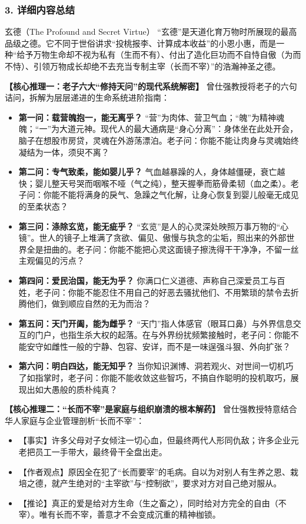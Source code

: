 \subsubsection{3. 详细内容总结}

\begin{ConceptBox}{玄德（The Profound and Secret Virtue）}
“玄德”是天道化育万物时所展现的最高品级之德。它不同于世俗讲求“投桃报李、计算成本收益”的小恩小惠，而是一种“给予万物生命却不视为私有（生而不有）、付出了造化巨功而不自恃自傲（为而不恃）、引领万物成长却绝不去充当专制主宰（长而不宰）”的浩瀚神圣之德。
\end{ConceptBox}

\noindent\textbf{【核心推理一：老子六大“修持天问”的现代系统解密】}
曾仕强教授将老子的六句诘问，拆解为层层递进的生命系统进阶指南：
\begin{itemize}
    \item \textbf{第一问：载营魄抱一，能无离乎？}
    “营”为肉体、营卫气血；“魄”为精神魂魄；“一”为大道元神。现代人的最大通病是“身心分离”：身体坐在此处开会，脑子在想股市房贷，灵魂在外游荡漂泊。老子问：你能不能让肉身与灵魂始终凝结为一体，须臾不离？
    \item \textbf{第二问：专气致柔，能如婴儿乎？}
    气血越暴躁的人，身体越僵硬，衰亡越快；婴儿整天号哭而咽喉不哑（气之纯），整天握拳而筋骨柔韧（血之柔）。老子问：你能不能将满身的戾气、急躁之气化解，让身心恢复到婴儿般毫无成见的至柔状态？
    \item \textbf{第三问：涤除玄览，能无疵乎？}
    “玄览”是人的心灵深处映照万事万物的“心镜”。世人的镜子上堆满了贪欲、偏见、傲慢与执念的尘垢，照出来的外部世界全是扭曲的。老子问：你能不能把心灵这面镜子擦洗得干干净净，不留一丝主观偏见的污点？
    \item \textbf{第四问：爱民治国，能无为乎？}
    你满口仁义道德、声称自己深爱员工与百姓，老子问：你能不能忍住不用自己的好恶去骚扰他们、不用繁琐的禁令去折腾他们，做到顺应自然的无为而治？
    \item \textbf{第五问：天门开阖，能为雌乎？}
    “天门”指人体感官（眼耳口鼻）与外界信息交互的门户，也指生杀大权的起落。在与外界纷扰频繁接触时，老子问：你能不能安守如雌性一般的宁静、包容、安详，而不是一味逞强斗狠、外向扩张？
    \item \textbf{第六问：明白四达，能无知乎？}
    当你知识渊博、洞若观火、对世间一切机巧了如指掌时，老子问：你能不能收敛这些智巧，不搞自作聪明的投机取巧，展现出如大愚般的质朴纯真？
\end{itemize}

\noindent\textbf{【核心推理二：“长而不宰”是家庭与组织崩溃的根本解药】}
曾仕强教授特意结合华人家庭与企业管理剖析“长而不宰”：
\begin{itemize}
    \item 【事实】许多父母对子女倾注一切心血，但最终两代人形同仇敌；许多企业元老把员工一手带大，最终骨干全盘出走。
    \item 【作者观点】原因全在犯了“长而要宰”的毛病。自以为对别人有生养之恩、栽培之德，就产生绝对的“主宰欲”与“控制欲”，要求对方对自己绝对服从。
    \item 【推论】真正的爱是给对方生命（生之畜之），同时给对方完全的自由（不宰）。唯有长而不宰，善意才不会变成沉重的精神枷锁。
\end{itemize}

